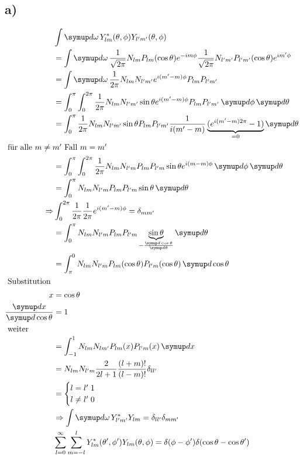     \subsection{a)}
    \begin{align}
    &\int \dif{\omega} Y_{lm}^* (\theta, \phi) Y_{l'm'}(\theta , \phi)\\
    &=\int \dif{\omega} \frac{1}{\sqrt{2 \pi}} N_{lm} P_{lm} (\cos \theta) e^{-im\phi} 
    \frac{1}{\sqrt{2 \pi}} N_{l'm'} P_{l'm'}(\cos \theta) e^{im' \phi}\\
    &=\int \dif{\omega} \frac{1}{2 \pi} N_{lm} N_{l'm'} e^{i(m'-m)\phi} P_{lm} P_{l'm'}\\
    &=\int_0^{\pi} \int_0^{2 \pi} \frac{1}{2 \pi} N_{lm} N_{l'm'} \sin \theta e^{i(m'-m)\phi} P_{lm} P_{l'm'}
    \dif{\phi} \dif{\theta}\\
    &=\int_0^{\pi} \frac{1}{2\pi} N_{lm} N_{l'm'} \sin \theta P_{lm} P_{l'm'} \frac{1}{i(m'-m)} 
    \underbrace{(e^{i(m'-m)2 \pi}-1 )}_{=0} \dif{\theta} \\
    \intertext{
        für alle $m \ne m'$ 
        Fall $m=m'$
    }
    &=\int_0^{\pi} \int_0^{2 \pi} \frac{1}{2 \pi} N_{lm} N_{l'm} P_{lm} P_{l'm} \sin \theta e^{i(m-m)\phi} \dif{\phi} \dif{\theta}\\
    &= \int_0^{\pi} N_{lm} N_{l'm} P_{lm} P_{l'm} \sin \theta \dif{\theta} \\
    \Rightarrow &\int_0^{2\pi} \frac{1}{2 \pi} \frac{1}{2\pi} e^{i(m'-m)\phi} = \delta _{mm'}\\
    &=\int_0^{\pi} N_{lm} N_{l'm} P_{lm} P_{l'm} \underbrace{\sin \theta}_{-\frac{\dif{\cos \theta}}{\dif{\theta}}} \dif{\theta}\\
    &= \int_{\pi}^0 N_{lm} N_{l'm} P_{lm}(\cos \theta) P_{l'm} (\cos \theta) \dif{\cos \theta}\\
    \intertext{
        Substitution 
    }    
    x&= \cos \theta\\
    \frac{\dif{x}}{\dif{\cos \theta}} &=1\\
    \intertext{
        weiter
    }
    &= \int _{-1}^1 N_{lm} N_{lm'} P_{lm}(x) P_{l'm}(x) \dif{x}\\
    &= N_{lm} N_{l'm} \frac{2}{2l+1} \frac{(l+m)!}{(l-m)!} \delta _{ll'} \\
    &=\begin{cases}
    l=l' \;1\\
    l \ne l' \;0
    \end{cases}\\
    &\Rightarrow \int \dif{\omega} Y_{l'm'}^* Y_{lm} = \delta_{ll'} \delta _{mm'}\\
    &\sum_{l=0}^{\infty} \sum_{m=-l}^l Y_{lm}^* (\theta ' , \phi ') Y_{lm} (\theta , \phi) = \delta (\phi - \phi ') \delta (\cos \theta - \cos \theta ')\\
    \end{align}

